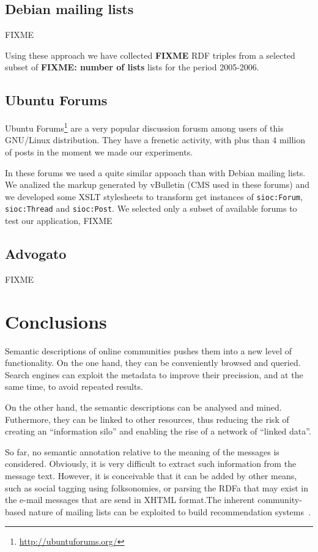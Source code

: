\documentclass{../templates/www2008-submission}
\begin{document}
\subsection{Debian mailing lists}

FIXME

Using these approach we have collected \textbf{FIXME} RDF triples
from a selected subset of \textbf{FIXME: number of lists} lists for
the period 2005-2006.

\subsection{Ubuntu Forums}

Ubuntu Forums\footnote{\url{http://ubuntuforums.org/}} are a very popular 
discussion forusm among users of this GNU/Linux distribution. They have a 
frenetic activity, with plus than 4 million of posts in the moment we made
our experiments.

In these forums we used a quite similar appoach than with Debian mailing
lists. We analized the markup generated by vBulletin (CMS used in these forums)
and we developed some XSLT stylesheets to transform get instances of
\texttt{sioc:Forum}, \texttt{sioc:Thread} and \texttt{sioc:Post}. We 
selected only a subset of available forums to test our application, FIXME

\subsection{Advogato}

FIXME


\section{\label{sec:conclusions}Conclusions}

Semantic descriptions of online communities pushes them
into a new level of functionality. On the one hand, they can be
conveniently browsed and queried. Search engines can exploit the
metadata to improve their precission, and at the same time, to
avoid repeated results.

On the other hand, the semantic descriptions can be
analysed and mined. Futhermore, they can be linked to other resources,
thus reducing the risk of creating an ``information silo'' and
enabling the rise of a network of ``linked data''.

So far, no semantic annotation relative to the meaning of
the messages is considered. Obviously, it is very difficult
to extract such information from the message text.
However, it is conceivable that it can be added by other 
means, such as social tagging using folksonomies, or parsing the 
RDFa that may exist in the e-mail messages that are send in XHTML 
format.The inherent community-based nature of mailing lists can
be exploited to build recommendation systems~\cite{Celma2006}.
\end{document}
